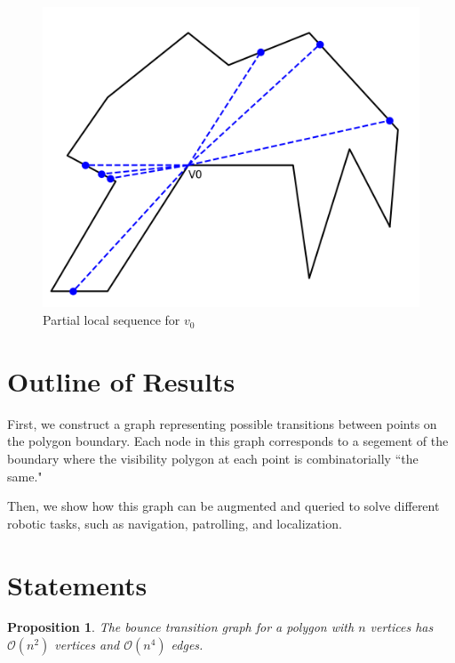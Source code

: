 \documentclass[]{article}  %
\newtheorem{proposition}[theorem]{\bf Proposition}
\begin{document}
\begin{figure}[h]
    \includegraphics[width=0.8\linewidth]{figures/partial_local_sequence.png}
    \caption{Partial local sequence for $v_0$}\label{fig:pls}
    \centering
\end{figure}

\section{Outline of Results}

First, we construct a graph representing possible transitions between points on
the polygon boundary. Each node in this graph corresponds to a segement of the
boundary where the visibility polygon at each point is combinatorially ``the
same."

Then, we show how this graph can be augmented and queried to solve different
robotic tasks, such as navigation, patrolling, and localization.

\section{Statements}

\begin{proposition} The bounce transition graph for a polygon with $n$ vertices has 
$\mathcal{O}(n^2)$ vertices and $\mathcal{O}(n^4)$ edges.
\end{proposition}
\end{document}
